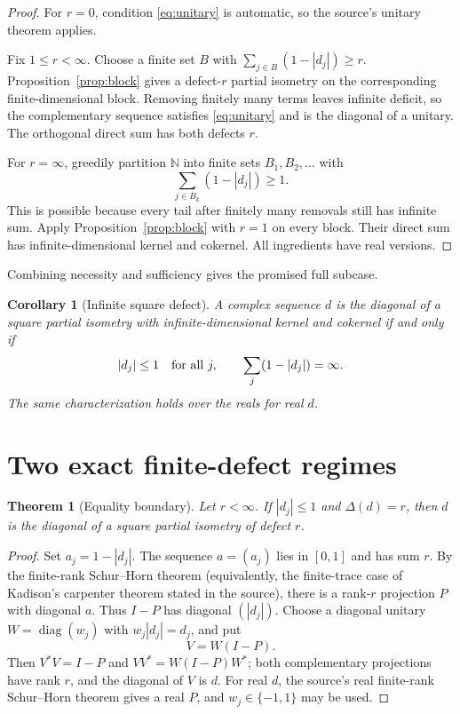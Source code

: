 \documentclass[11pt]{article}
\newtheorem{theorem}{Theorem}
\newtheorem{corollary}{Corollary}
\newcommand{\N}{\mathbb N}
\begin{document}
\begin{proof}
For $r=0$, condition \eqref{eq:unitary} is automatic, so the source's
unitary theorem applies.

Fix $1\le r<\infty$.  Choose a finite set $B$ with
$\sum_{j\in B}(1-|d_j|)\ge r$.  Proposition~\ref{prop:block} gives a
defect-$r$ partial isometry on the corresponding finite-dimensional block.
Removing finitely many terms leaves infinite deficit, so the complementary
sequence satisfies \eqref{eq:unitary} and is the diagonal of a unitary.  The
orthogonal direct sum has both defects $r$.

For $r=\infty$, greedily partition $\N$ into finite sets
$B_1,B_2,\ldots$ with
\[
 \sum_{j\in B_k}(1-|d_j|)\ge1.
\]
This is possible because every tail after finitely many removals still has
infinite sum.  Apply Proposition~\ref{prop:block} with $r=1$ on every
block.  Their direct sum has infinite-dimensional kernel and cokernel.  All
ingredients have real versions.
\end{proof}

Combining necessity and sufficiency gives the promised full subcase.

\begin{corollary}[Infinite square defect]\label{cor:infinite}
A complex sequence $d$ is the diagonal of a square partial isometry with
infinite-dimensional kernel and cokernel if and only if
\[
 |d_j|\le1\quad\hbox{for all }j,
 \qquad \sum_j(1-|d_j|)=\infty.
\]
The same characterization holds over the reals for real $d$.
\end{corollary}

\section{Two exact finite-defect regimes}

\begin{theorem}[Equality boundary]\label{thm:equality}
Let $r<\infty$.  If $|d_j|\le1$ and $\Delta(d)=r$, then $d$ is the
diagonal of a square partial isometry of defect $r$.
\end{theorem}

\begin{proof}
Set $a_j=1-|d_j|$.  The sequence $a=(a_j)$ lies in $[0,1]$ and has sum
$r$.  By the finite-rank Schur--Horn theorem (equivalently, the finite-trace
case of Kadison's carpenter theorem stated in the source), there is a
rank-$r$ projection $P$ with diagonal $a$.  Thus $I-P$ has diagonal
$(|d_j|)$.  Choose a diagonal unitary $W=\operatorname{diag}(w_j)$ with
$w_j|d_j|=d_j$, and put
\[
 V=W(I-P).
\]
Then $V^*V=I-P$ and $VV^*=W(I-P)W^*$; both complementary projections have
rank $r$, and the diagonal of $V$ is $d$.  For real $d$, the source's
real finite-rank Schur--Horn theorem gives a real $P$, and
$w_j\in\{-1,1\}$ may be used.
\end{proof}
\end{document}
